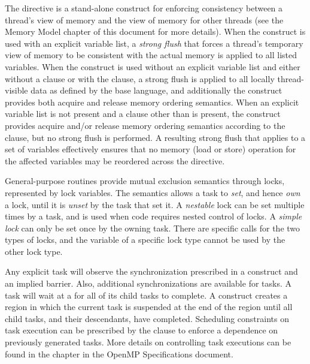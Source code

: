 The  directive is a stand-alone construct for enforcing consistency
between a thread's view of memory and the view of memory for other threads (see
the Memory Model chapter of this document for more details). When the construct
is used with an explicit variable list, a \emph{strong flush} that forces a
thread's temporary view of memory to be consistent with the actual memory is
applied to all listed variables. When the construct is used without an explicit
variable list and either without a  clause or with the
  clause, a strong flush is applied to all
locally thread-visible data as defined by the base language, and additionally
the construct provides both acquire and release memory ordering semantics.
When an explicit variable list is not present and a  clause
other than  is present, the construct provides acquire and/or
release memory ordering semantics according to the  clause,
but no strong flush is performed. A resulting strong flush that applies to a
set of variables effectively ensures that no memory (load or store) operation
for the affected variables may be reordered across the  directive.

General-purpose routines provide mutual exclusion semantics through locks, 
represented by lock variables.  
The semantics allows a task to \emph{set}, and hence 
\emph{own} a lock, until it is \emph{unset} by the task that set it. A 
\emph{nestable} lock can be set multiple times by a task, and is used
when code requires nested control of locks.  A \emph{simple lock} can
only be set once by the owning task. There are specific calls for the two
types of locks, and the variable of a specific lock type cannot be used by the
other lock type.  

Any explicit task will observe the synchronization prescribed in a
 construct and an implied barrier.  Also, additional
synchronizations are available for tasks.  A task will wait at a
 for all of its child tasks to complete.  A 
construct creates a region in which the current task is suspended at the end of
the region until all child tasks, and their descendants, have completed.
Scheduling constraints on task execution can be prescribed by the
 clause to enforce a dependence on previously generated tasks.
More details on controlling task executions can be found in the  chapter in the OpenMP Specifications document. %















 





